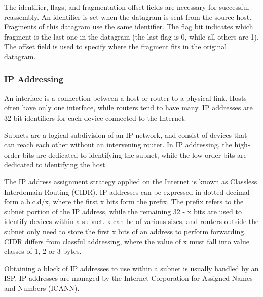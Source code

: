 \documentclass[12pt,titlepage]{article}
\begin{document}
        The identifier, flags, and fragmentation offset fields are necessary for successful reassembly. An identifier is set when the datagram is sent from
        the source host. Fragments of this datagram use the same identifier. The flag bit indicates which fragment is the last one in the datagram
        (the last flag is 0, while all others are 1). The offset field is used to specify where the fragment fits in the original datagram.

      \subsubsection{IP Addressing}
        An interface is a connection between a host or router to a physical link. Hosts often have only one interface, while routers tend to have many.
        IP addresses are 32-bit identifiers for each device connected to the Internet.

        Subnets are a logical subdivision of an IP network, and consist of devices that can reach each other without an intervening router. In IP addressing,
        the high-order bits are dedicated to identifying the subnet, while the low-order bits are dedicated to identifying the host.

        The IP address assignment strategy applied on the Internet is known as Classless Interdomain Routing (CIDR). IP addresses can be expressed in dotted
        decimal form a.b.c.d/x, where the first x bits form the prefix. The prefix refers to the subnet portion of the IP address, while the remaining
        32 - x bits are used to identify devices within a subnet. x can be of various sizes, and routers outside the subnet only need to store the first x bits
        of an address to perform forwarding. CIDR differs from classful addressing, where the value of x must fall into value classes of 1, 2 or 3 bytes.

        Obtaining a block of IP addresses to use within a subnet is usually handled by an ISP. IP addresses are managed by the Internet Corporation for
        Assigned Names and Numbers (ICANN).
\end{document}
